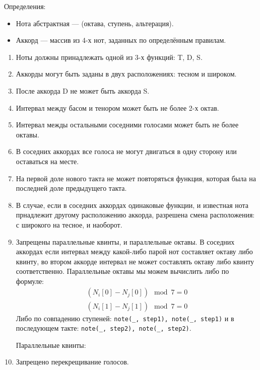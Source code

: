 \documentclass[12pt]{article}
\begin{document}
Определения:

\begin{itemize}
\item Нота абстрактная --- (октава, ступень, альтерация).
\item Аккорд --- массив из 4-х нот, заданных по определённым правилам.
\end{itemize}

\begin{enumerate}
\item Ноты должны принадлежать одной из 3-х функций: T, D, S.
\item Аккорды могут быть заданы в двух расположениях: тесном и широком.
\item После аккорда D не может быть аккорда S.
\item Интервал между басом и тенором может быть не более 2-х октав.
\item Интервал межды остальными соседними голосами может быть не более октавы.
\item В соседних аккордах все голоса не могут двигаться в одну сторону или оставаться на месте.
\item На первой доле нового такта не может повторяться функция, которая была на последней доле предыдущего такта.
\item В случае, если в соседних аккордах одинаковые функции, и известная нота прнадлежит другому расположению аккорда, разрешена смена расположения: с широкого на тесное, и наоборот.
\item Запрещены параллельные квинты, и параллельные октавы. В соседних аккордах если интервал между какой-либо парой нот составляет октаву либо квинту, во втором аккорде интервал не может составлять октаву либо квинту соответственно.
  Параллельные октавы мы можем вычислить либо по формуле:
  \begin{equation}
    \begin{aligned}
      (N_i[0] - N_j[0]) \mod 7 = 0\\
      (N_i[1] - N_j[1]) \mod 7 = 0
    \end{aligned}
  \end{equation}
  Либо по совпадению ступеней: {\tt note(\_, step1), note(\_, step1)} и в последующем такте: {\tt note(\_, step2), note(\_, step2)}.

  Параллельные квинты:
\item Запрещено перекрещивание голосов.
\end{enumerate}
\end{document}
